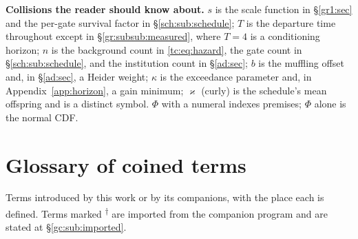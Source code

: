 \documentclass[11pt]{article}
\numberwithin{equation}{section}
\theoremstyle{plain}
\theoremstyle{definition}
\theoremstyle{remark}
\begin{document}
\smallskip
\noindent\textbf{Collisions the reader should know about.} $s$ is the
scale function in \S\ref{gr1:sec} and the per-gate survival factor in
\S\ref{sch:sub:schedule}; $T$ is the departure time throughout except in
\S\ref{gr:subsub:measured}, where $T=4$ is a conditioning horizon; $n$ is
the background count in \eqref{tc:eq:hazard}, the gate count in
\S\ref{sch:sub:schedule}, and the institution count in \S\ref{ad:sec};
$b$ is the muffling offset and, in \S\ref{ad:sec}, a Heider weight;
$\kappa$ is the exceedance parameter and, in Appendix~\ref{app:horizon},
a gain minimum; $\varkappa$ (curly) is the schedule's mean offspring and
is a distinct symbol. $\Phi$ with a numeral indexes premises; $\Phi$
alone is the normal CDF.

\section*{Glossary of coined terms}\label{sec:glossary}

\noindent Terms introduced by this work or by its companions, with the
place each is defined. Terms marked \textsuperscript{$\dagger$} are
imported from the companion program and are stated at
\S\ref{gc:sub:imported}.
\end{document}
